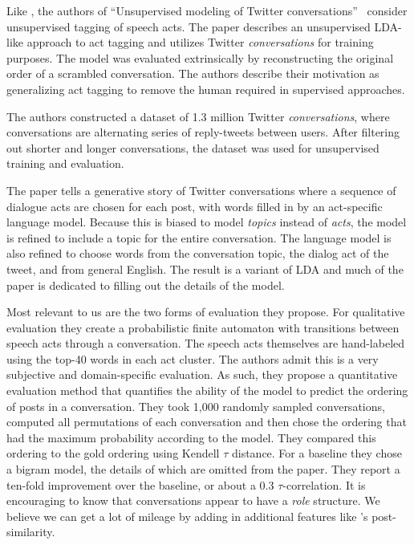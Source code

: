 \documentclass[10pt]{article}
\newcommand{\titlecite}[2]{``#1''~\cite{#2}}
\begin{document}
Like \cite{Paula}, the authors of \titlecite{Unsupervised modeling of Twitter
conversations}{Ritter2010a} consider unsupervised tagging of speech acts.
The paper describes an unsupervised LDA-like approach to act tagging 
and utilizes Twitter \textit{conversations} for
training purposes. The model was evaluated extrinsically by reconstructing 
the original order of a scrambled conversation. The authors describe their motivation as
generalizing act tagging to remove the human required in supervised approaches. 

The authors constructed a dataset of 1.3 million Twitter \textit{conversations}, 
where conversations are alternating series of reply-tweets between users. After filtering out shorter 
and longer conversations, the dataset was used for unsupervised training and evaluation.

The paper tells a generative story of Twitter conversations where a sequence of dialogue
acts are chosen for each post, with words filled in by an act-specific language model.
Because this is biased to model \textit{topics}
instead of \textit{acts}, the model is refined to include a topic 
for the entire conversation. The language model is also refined to choose words from
the conversation topic, the dialog act of the tweet, and from general English. The result
is a variant of LDA and much of the paper is dedicated to filling out the details of the model.

Most relevant to us are the two forms of evaluation they propose. For
qualitative evaluation they create a probabilistic finite automaton with
transitions between speech acts through a conversation. The speech acts
themselves are hand-labeled using the top-40 words in each act cluster. The 
authors admit this is a very subjective and domain-specific evaluation. As such,
they propose a quantitative evaluation method that quantifies the ability of
the model to predict the ordering of posts in a conversation. They took
1,000 randomly sampled conversations, computed all permutations
of each conversation and then chose the ordering that had the maximum
probability according to the model. They compared this ordering to the gold
ordering using Kendell $\tau$ distance. For a baseline they chose a bigram
model, the details of which are omitted from the paper. They report a ten-fold improvement
over the baseline, or about a 0.3 $\tau$-correlation. It is encouraging to know
that conversations appear to have a \textit{role} structure. We believe we can get a lot of mileage
by adding in additional features like \cite{Wang2008a}'s post-similarity.
\end{document}
